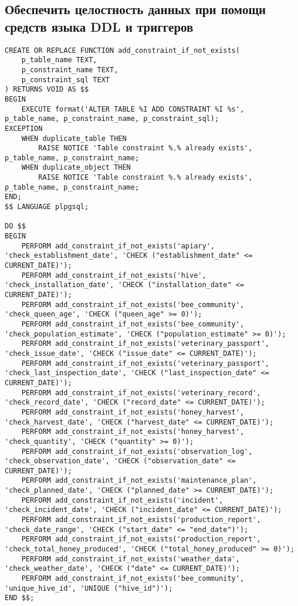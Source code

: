 \documentclass{article}
\begin{document}
\subsection{Обеспечить целостность данных при помощи средств языка DDL и триггеров}
\begin{lstlisting}
CREATE OR REPLACE FUNCTION add_constraint_if_not_exists(
    p_table_name TEXT,
    p_constraint_name TEXT,
    p_constraint_sql TEXT
) RETURNS VOID AS $$
BEGIN
    EXECUTE format('ALTER TABLE %I ADD CONSTRAINT %I %s', p_table_name, p_constraint_name, p_constraint_sql);
EXCEPTION
    WHEN duplicate_table THEN
        RAISE NOTICE 'Table constraint %.% already exists', p_table_name, p_constraint_name;
    WHEN duplicate_object THEN
        RAISE NOTICE 'Table constraint %.% already exists', p_table_name, p_constraint_name;
END;
$$ LANGUAGE plpgsql;

DO $$
BEGIN
    PERFORM add_constraint_if_not_exists('apiary', 'check_establishment_date', 'CHECK ("establishment_date" <= CURRENT_DATE)');
    PERFORM add_constraint_if_not_exists('hive', 'check_installation_date', 'CHECK ("installation_date" <= CURRENT_DATE)');
    PERFORM add_constraint_if_not_exists('bee_community', 'check_queen_age', 'CHECK ("queen_age" >= 0)');
    PERFORM add_constraint_if_not_exists('bee_community', 'check_population_estimate', 'CHECK ("population_estimate" >= 0)');
    PERFORM add_constraint_if_not_exists('veterinary_passport', 'check_issue_date', 'CHECK ("issue_date" <= CURRENT_DATE)');
    PERFORM add_constraint_if_not_exists('veterinary_passport', 'check_last_inspection_date', 'CHECK ("last_inspection_date" <= CURRENT_DATE)');
    PERFORM add_constraint_if_not_exists('veterinary_record', 'check_record_date', 'CHECK ("record_date" <= CURRENT_DATE)');
    PERFORM add_constraint_if_not_exists('honey_harvest', 'check_harvest_date', 'CHECK ("harvest_date" <= CURRENT_DATE)');
    PERFORM add_constraint_if_not_exists('honey_harvest', 'check_quantity', 'CHECK ("quantity" >= 0)');
    PERFORM add_constraint_if_not_exists('observation_log', 'check_observation_date', 'CHECK ("observation_date" <= CURRENT_DATE)');
    PERFORM add_constraint_if_not_exists('maintenance_plan', 'check_planned_date', 'CHECK ("planned_date" >= CURRENT_DATE)');
    PERFORM add_constraint_if_not_exists('incident', 'check_incident_date', 'CHECK ("incident_date" <= CURRENT_DATE)');
    PERFORM add_constraint_if_not_exists('production_report', 'check_date_range', 'CHECK ("start_date" <= "end_date")');
    PERFORM add_constraint_if_not_exists('production_report', 'check_total_honey_produced', 'CHECK ("total_honey_produced" >= 0)');
    PERFORM add_constraint_if_not_exists('weather_data', 'check_weather_date', 'CHECK ("date" <= CURRENT_DATE)');
    PERFORM add_constraint_if_not_exists('bee_community', 'unique_hive_id', 'UNIQUE ("hive_id")');
END $$;

\end{lstlisting}
\end{document}
